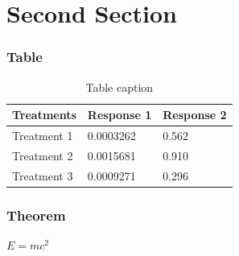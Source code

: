 \documentclass{beamer}
\begin{document}
%
%


\section{Second Section}

\begin{frame}
\frametitle{Table}
\begin{table}
\begin{tabular}{l l l}
\toprule
\textbf{Treatments} & \textbf{Response 1} & \textbf{Response 2}\\
\midrule
Treatment 1 & 0.0003262 & 0.562 \\
Treatment 2 & 0.0015681 & 0.910 \\
Treatment 3 & 0.0009271 & 0.296 \\
\bottomrule
\end{tabular}
\caption{Table caption}
\end{table}
\end{frame}


\begin{frame}
\frametitle{Theorem}
\begin{theorem}
$E = mc^2$
\end{theorem}
\end{frame}
\end{document}
